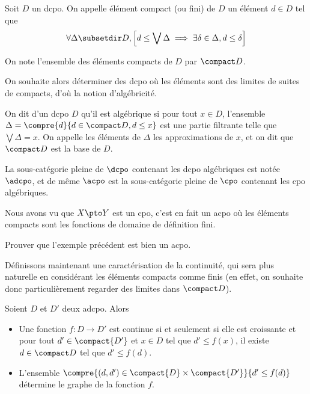 \begin{defi}
    Soit $D$ un dcpo. On appelle élément compact (ou fini) de $D$ un élément $d\in D$ tel que $$\forall \Delta\subsetdir D, \left[d\leq \bigvee \Delta \implies \exists \delta\in\Delta, d\leq \delta\right]$$
    
    On note l'ensemble des éléments compacts de $D$ par $\compact D$.
\end{defi}

On souhaite alors déterminer des dcpo où les éléments sont des limites de suites de compacts, d'où la notion d'algébricité.

\begin{defi}[Algébricité]
    On dit d'un dcpo $D$ qu'il est algébrique si pour tout $x\in D$, l'ensemble $\Delta=\compre{d}{d\in\compact D, d\leq x}$ est une partie filtrante telle que $\bigvee\Delta = x$. On appelle les éléments de $\Delta$ les approximations de $x$, et on dit que $\compact D$ est la base de $D$.
    
    La sous-catégorie pleine de $\dcpo$ contenant les dcpo algébriques est notée $\adcpo$, et de même $\acpo$ est la sous-catégorie pleine de $\cpo$ contenant les cpo algébriques.
\end{defi}

\begin{expl}
    Nous avons vu que $X\pto Y$ est un cpo, c'est en fait un acpo où les éléments compacts sont les fonctions de domaine de définition fini.
\end{expl}

\begin{exo}
    Prouver que l'exemple précédent est bien un acpo.
\end{exo}

Définissons maintenant une caractérisation de la continuité, qui sera plus naturelle en considérant les éléments compacts comme finis (en effet, on souhaite donc particulièrement regarder des limites dans $\compact D$).

\begin{prop}
    Soient $D$ et $D'$ deux adcpo. Alors
    \begin{itemize}[label=$\bullet$]
        \item Une fonction $f : D \to D'$ est continue si et seulement si elle est croissante et pour tout $d'\in\compact{D'}$ et $x\in D$ tel que $d'\leq f(x)$, il existe $d\in\compact D$ tel que $d'\leq f(d)$.
        \item L'ensemble $\compre{(d,d')\in\compact{D}\times\compact{D'}}{d'\leq f(d)}$ détermine le graphe de la fonction $f$.
    \end{itemize}
\end{prop}

